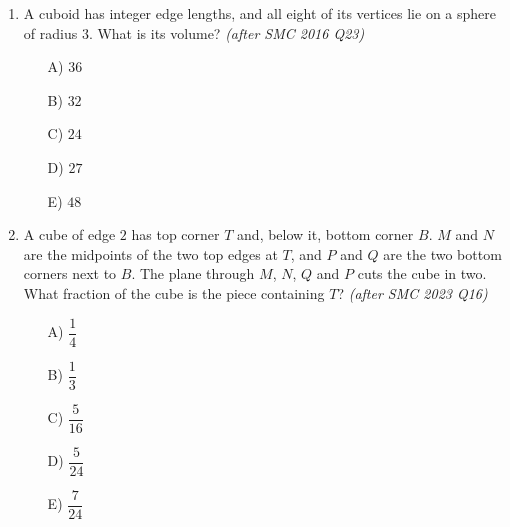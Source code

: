 \documentclass[11pt,a4paper]{article}
\begin{document}
\begin{enumerate}

\item A cuboid has integer edge lengths, and all eight of its vertices lie on a sphere of radius $3$. What is its volume? \textit{\small(after SMC 2016 Q23)}
\begin{itemize}
\item[A)] $36$
\item[B)] $32$
\item[C)] $24$
\item[D)] $27$
\item[E)] $48$
\end{itemize}

\item \begin{minipage}[t]{0.60\linewidth}
A cube of edge $2$ has top corner $T$ and, below it, bottom corner $B$. $M$ and $N$ are the midpoints of the two top edges at $T$, and $P$ and $Q$ are the two bottom corners next to $B$. The plane through $M$, $N$, $Q$ and $P$ cuts the cube in two. What fraction of the cube is the piece containing $T$? \textit{\small(after SMC 2023 Q16)}
\begin{itemize}[itemsep=3pt]
\item[A)] $\dfrac14$
\item[B)] $\dfrac13$
\item[C)] $\dfrac{5}{16}$
\item[D)] $\dfrac{5}{24}$
\item[E)] $\dfrac{7}{24}$
\end{itemize}
\end{minipage}\hfill
\begin{minipage}[t]{0.36\linewidth}
\vspace{0pt}
\centering
{}
\end{minipage}


\end{enumerate}
\end{document}
